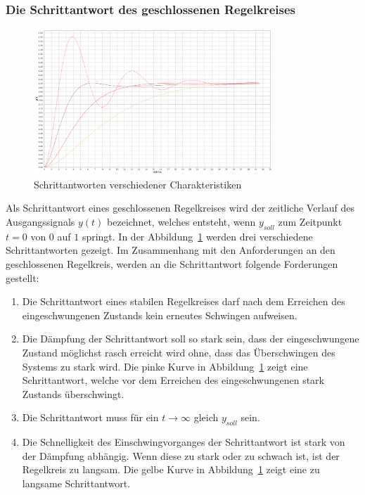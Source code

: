 \subsubsection*{Die Schrittantwort des geschlossenen Regelkreises}

\begin{figure}[h!, width=\pagewidth]
    \begin{center}
    \includegraphics[width=0.8\textwidth]{images/schrittantworten.png}
    \caption{Schrittantworten verschiedener Charakteristiken}
    \label{fig:stepresponse}
    \end{center}
\end{figure}

Als  Schrittantwort  eines  geschlossenen   Regelkreises  wird  der  zeitliche
Verlauf  des   Ausgangssignals  $y(t)$  bezeichnet,  welches   entsteht,  wenn
$y_{soll}$   zum   Zeitpunkt  $t=0$   von   $0$   auf  $1$   springt. In   der
Abbildung~\ref{fig:stepresponse}  werden  drei  verschiedene  Schrittantworten
gezeigt.   Im   Zusammenhang  mit  den  Anforderungen   an  den  geschlossenen
Regelkreis, werden an die Schrittantwort folgende Forderungen gestellt:

\begin{enumerate}
    \item
        Die Schrittantwort eines stabilen Regelkreises darf nach dem Erreichen
        des eingeschwungenen Zustands kein erneutes Schwingen aufweisen.
    \item
        Die  D\"ampfung  der  Schrittantwort  soll so  stark  sein,  dass  der
        eingeschwungene  Zustand m\"oglichst  rasch erreicht  wird ohne,  dass
        das  \"Uberschwingen des  Systems zu  stark wird. Die  pinke Kurve  in
        Abbildung~\ref{fig:stepresponse} zeigt eine Schrittantwort, welche vor
        dem Erreichen des eingeschwungenen stark Zustands \"uberschwingt.
    \item
        Die   Schrittantwort  muss   f\"ur  ein   $t\rightarrow\infty$  gleich
        $y_{soll}$ sein.
    \item
        Die  Schnelligkeit  des  Einschwingvorganges  der  Schrittantwort  ist
        stark  von  der  D\"ampfung   abh\"angig. Wenn  diese  zu  stark  oder
        zu   schwach   ist,  ist   der   Regelkreis   zu  langsam. Die   gelbe
        Kurve  in  Abbildung~\ref{fig:stepresponse}  zeigt  eine  zu  langsame
        Schrittantwort.
\end{enumerate}

